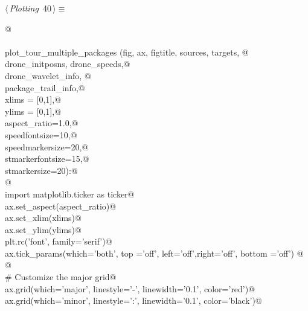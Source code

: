 \documentclass[10pt, english, oneside]{report}
\begin{document}
\begin{appendices}
\begin{flushleft} \small
\begin{minipage}{\linewidth}\label{scrap35}\raggedright\small
{} $\langle\,${\itshape Plotting}\nobreak\ {\footnotesize {40}}$\,\rangle\equiv$
\vspace{-1ex}
\begin{list}{}{} \item
\mbox{}\verb@   @\\
\mbox{}\verb@@\\
\mbox{}\verb@def plot_tour_multiple_packages (fig, ax, figtitle, sources, targets, @\\
\mbox{}\verb@          drone_initposns, drone_speeds,@\\
\mbox{}\verb@          drone_wavelet_info, @\\
\mbox{}\verb@          package_trail_info,@\\
\mbox{}\verb@          xlims = [0,1],@\\
\mbox{}\verb@          ylims = [0,1],@\\
\mbox{}\verb@          aspect_ratio=1.0,@\\
\mbox{}\verb@          speedfontsize=10,@\\
\mbox{}\verb@          speedmarkersize=20,@\\
\mbox{}\verb@          stmarkerfontsize=15,@\\
\mbox{}\verb@          stmarkersize=20):@\\
\mbox{}\verb@    @\\
\mbox{}\verb@    import matplotlib.ticker as ticker@\\
\mbox{}\verb@    ax.set_aspect(aspect_ratio)@\\
\mbox{}\verb@    ax.set_xlim(xlims)@\\
\mbox{}\verb@    ax.set_ylim(ylims)@\\
\mbox{}\verb@    plt.rc('font', family='serif')@\\
\mbox{}\verb@    ax.tick_params(which='both', top ='off', left='off',right='off', bottom ='off') @\\
\mbox{}\verb@    @\\
\mbox{}\verb@    # Customize the major grid@\\
\mbox{}\verb@    ax.grid(which='major', linestyle='-', linewidth='0.1', color='red')@\\
\mbox{}\verb@    ax.grid(which='minor', linestyle=':', linewidth='0.1', color='black')@\\
\mbox{}\verb@@\\

\end{list}
\end{minipage}
\end{flushleft}
\end{appendices}
\end{document}
